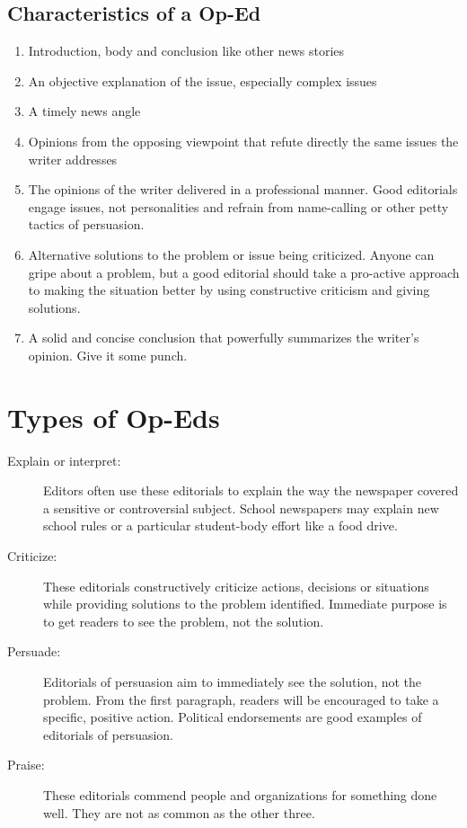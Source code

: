 \documentclass{tufte-handout}\usepackage[]{graphicx}\usepackage[]{color}
\begin{document}
\subsection{Characteristics of a Op-Ed}

\begin{enumerate}
	\item Introduction, body and conclusion like other news stories
	\item An objective explanation of the issue, especially complex issues
	\item A timely news angle
	\item Opinions from the opposing viewpoint that refute directly the same issues the writer addresses
	\item The opinions of the writer delivered in a professional manner. Good editorials engage issues, not personalities and refrain from name-calling or other petty tactics of persuasion.
	\item Alternative solutions to the problem or issue being criticized. Anyone can gripe about a problem, but a good editorial should take a pro-active approach to making the situation better by using constructive criticism and giving solutions.
	\item A solid and concise conclusion that powerfully summarizes the writer's opinion. Give it some punch.
\end{enumerate}


\section{Types of Op-Eds}

\begin{description}
	\item[Explain or interpret:] Editors often use these editorials to explain the way the newspaper covered a sensitive or controversial subject. School newspapers may explain new school rules or a particular student-body effort like a food drive.
	\item[Criticize:] These editorials constructively criticize actions, decisions or situations while providing solutions to the problem identified. Immediate purpose is to get readers to see the problem, not the solution.
	\item[Persuade:] Editorials of persuasion aim to immediately see the solution, not the problem. From the first paragraph, readers will be encouraged to take a specific, positive action. Political endorsements are good examples of editorials of persuasion.
	\item[Praise:] These editorials commend people and organizations for something done well. They are not as common as the other three.
\end{description}
 
\end{document}

